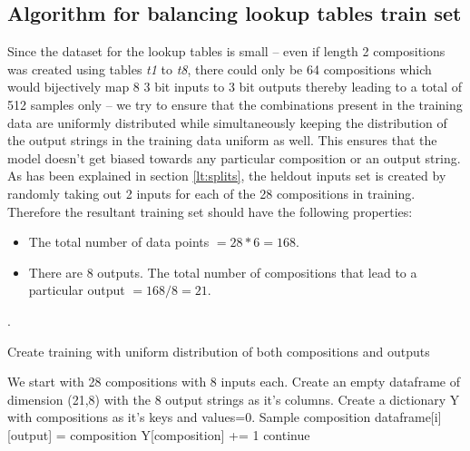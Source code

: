 \begin{appendix}
	
\chapter{Algorithm for balancing lookup tables train set}\label{Chapter:results}

Since the dataset for the lookup tables is small -- even if length 2 compositions was created using tables \textit{t1} to \textit{t8}, there could only be 64 compositions which would bijectively map 8 3 bit inputs to 3 bit outputs thereby leading to a total of 512 samples only -- we try to ensure that the combinations present in the training data are uniformly distributed while simultaneously keeping the distribution of the output strings in the training data uniform as well. This ensures that the model doesn't get biased towards any particular composition or an output string. As has been explained in section \ref{lt:splits}, the heldout inputs set is created by randomly taking out 2 inputs for each of the 28 compositions in training. Therefore the resultant training set should have the following properties:
\begin{itemize}
	\item The total number of data points  $= 28*6 = 168$.
	\item There are 8 outputs. The total number of compositions that lead to a particular output $=168/8 = 21$.
\end{itemize}

.
\begin{algorithm}
	\caption{Create training with uniform distribution of both compositions and outputs}
	\begin{algorithmic}
		\STATE We start with 28 compositions with 8 inputs each.
		\STATE Create an empty dataframe of dimension (21,8) with the 8 output strings as it's columns.
		\STATE Create a dictionary Y with compositions as it's keys and values=0.
		\FOR {i in range [0, 21)}
		\STATE Sample composition
		\STATE dataframe[i][output] = composition
		\STATE Y[composition] += 1
		\ELSE
		\STATE continue
		\ENDIF
		\ENDFOR
		\ENDFOR		
	\end{algorithmic}
\end{algorithm}

\end{appendix}
